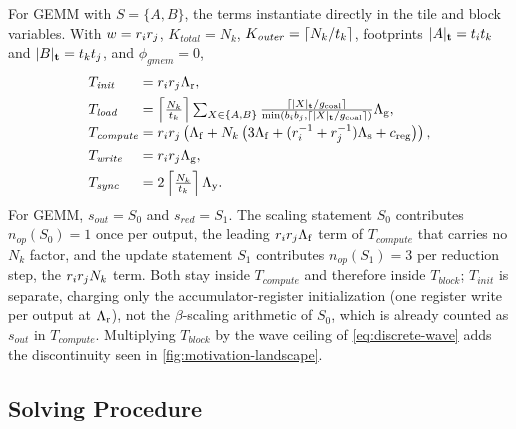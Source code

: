For GEMM with \(S=\{A,B\}\), the terms instantiate directly in the tile and block variables. With \(w=r_ir_j\), \(K_{\mathit{total}}=N_k\), \(K_{\mathit{outer}}=\lceil N_k/t_k\rceil\), footprints \(|A|_{\mathbf{t}}=t_it_k\) and \(|B|_{\mathbf{t}}=t_kt_j\), and \(\phi_{\mathit{gmem}}=0\),
\begingroup
\renewcommand{\arraystretch}{1.18}
\[
\begin{array}{@{}l@{\;}l@{}}
T_{\mathit{init}}
&= \rblk_i\rblk_j\Lr,\\[1ex]
T_{\mathit{load}}
&= \left\lceil\frac{N_k}{\tile_k}\right\rceil
   \sum_{X\in\{A,B\}}
   \frac{\lceil |X|_{\tvec}/\gcoal\rceil}
   {\min(b_i b_j,\lceil |X|_{\tvec}/\gcoal\rceil)}
   \Lg,\\[1ex]
T_{\mathit{compute}}
&= \rblk_i\rblk_j
   \left(
   \Lf
   + N_k\left(3\Lf+(\rblk_i^{-1}+\rblk_j^{-1})\Ls+\creg\right)
   \right),\\[1ex]
T_{\mathit{write}}
&= \rblk_i\rblk_j\Lg,\\[1ex]
T_{\mathit{sync}}
&= 2\left\lceil\frac{N_k}{\tile_k}\right\rceil\Ly.
\end{array}
\]
\endgroup
For GEMM, \(s_{\mathit{out}}=S_0\) and \(s_{\mathit{red}}=S_1\). The scaling statement \(S_0\) contributes \(n_{\mathit{op}}(S_0)=1\) once per output, the leading \(r_ir_j\Lambda_{\mathrm f}\) term of \(T_{\mathit{compute}}\) that carries no \(N_k\) factor, and the update statement \(S_1\) contributes \(n_{\mathit{op}}(S_1)=3\) per reduction step, the \(r_ir_jN_k\) term. Both stay inside \(T_{\mathit{compute}}\) and therefore inside \(T_{\mathit{block}}\); \(T_{\mathit{init}}\) is separate, charging only the accumulator-register initialization (one register write per output at \(\Lambda_{\mathrm r}\)), not the \(\beta\)-scaling arithmetic of \(S_0\), which is already counted as \(s_{\mathit{out}}\) in \(T_{\mathit{compute}}\). Multiplying \(T_{\mathit{block}}\) by the wave ceiling of \autoref{eq:discrete-wave} adds the discontinuity seen in \autoref{fig:motivation-landscape}.

\subsection{Solving Procedure}
\label{sec:solver}
\label{sec:two-stage-solver}


